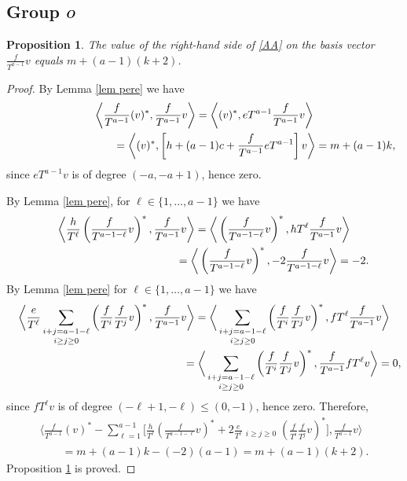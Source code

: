 \documentclass[11pt]{article}
\numberwithin{equation}{section}
\newtheorem{prop}[thm]{Proposition}
{\theoremstyle{definition}
\newtheorem*{rem}{Remark}}
\begin{document}
\subsection[Group ${\rm O}$]{Group $\boldsymbol{{\rm O}}$}\label{subsec group O}
\begin{prop}\label{Pr4}The value of the right-hand side of \eqref{AA} on the basis vector $\frac{f}{T^{a-1}}v$ equals $m + (a-1)(k+2)$.
\end{prop}
\begin{proof}By Lemma \ref{lem pere} we have{\samepage
\begin{gather*}
\left\langle \frac{f}{T^{a-1}} (v)^*, \frac{f}{T^{a-1}} v \right\rangle = \left\langle (v)^*, eT^{a-1} \frac{f}{T^{a-1}} v \right\rangle \\
\hphantom{\left\langle \frac{f}{T^{a-1}} (v)^*, \frac{f}{T^{a-1}} v \right\rangle} = \left\langle (v)^*, \left[ h+(a-1)c + \frac{f}{T^{a-1}} eT^{a-1} \right] v \right\rangle = m + (a-1)k,
\end{gather*}
since $eT^{a-1} v$ is of degree $(-a, -a+1)$, hence zero.}

By Lemma \ref{lem pere}, for $ \ell \in \{ 1, \dots, a-1 \}$ we have
\begin{gather*}
 \bigg\langle \frac{h}{T^{\ell}} \left( \frac{f}{T^{a-1-\ell}} v \right)^*, \frac{f}{T^{a-1}} v \bigg\rangle
 = \bigg\langle \left( \frac{f}{T^{a-1-\ell}} v \right)^*, hT^{\ell} \frac{f}{T^{a-1}} v \bigg\rangle \\
 \hphantom{\bigg\langle \frac{h}{T^{\ell}} \left( \frac{f}{T^{a-1-\ell}} v \right)^*, \frac{f}{T^{a-1}} v \bigg\rangle}{} = \bigg\langle \left( \frac{f}{T^{a-1-\ell}} v \right)^*, -2 \frac{f}{T^{a-1-\ell}} v \bigg\rangle = -2.
\end{gather*}
By Lemma \ref{lem pere} for $ \ell \in \{ 1, \dots, a-1 \}$ we have
\begin{gather*}
\bigg\langle \frac{e}{T^{\ell}} \mathop{\sum_{i+j=a-1-\ell}}_{i\geq j\geq 0} \left(\frac{f}{T^i} \frac{f}{T^j}v \right)^*, \frac{f}{T^{a-1}} v \bigg\rangle = \bigg\langle \mathop{\sum_{i+j=a-1-\ell}}_{i\geq j\geq 0} \left(\frac{f}{T^i} \frac{f}{T^j}v \right)^*, fT^{\ell} \frac{f}{T^{a-1}} v \bigg\rangle \\
\hphantom{\bigg\langle \frac{e}{T^{\ell}} \mathop{\sum_{i+j=a-1-\ell}}_{i\geq j\geq 0} \left(\frac{f}{T^i} \frac{f}{T^j}v \right)^*, \frac{f}{T^{a-1}} v \bigg\rangle} = \bigg\langle \mathop{\sum_{i+j=a-1-\ell}}_{i\geq j\geq 0} \left(\frac{f}{T^i} \frac{f}{T^j}v \right)^*, \frac{f}{T^{a-1}} fT^{\ell} v \bigg\rangle =0,
\end{gather*}
since $fT^{\ell} v$ is of degree $ (-\ell+1, -\ell) \leq (0,-1)$, hence zero. Therefore,
\begin{gather*}
\bigg\langle \frac{f}{T^{a-1}} (v)^* - \sum_{\ell=1}^{a-1} \bigg[\frac{h}{T^\ell}\left(\frac{f}{T^{a-1-\ell}}v\right)^* + 2\frac{e}{T^\ell} \mathop{\sum_{i+j=a-1-\ell}}_{i\geq j\geq 0} \left(\frac{f}{T^i}\frac{f}{T^j}v\right)^* \bigg], \frac{f}{T^{a-1}} v \bigg\rangle \\
\qquad{}= m + (a-1)k - (-2)(a-1) = m + (a-1)(k+2).
\end{gather*}
Proposition \ref{Pr4} is proved.
\end{proof}
\end{document}
